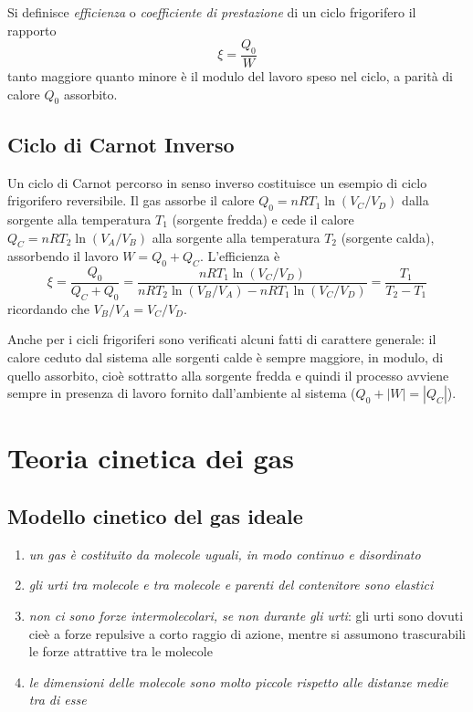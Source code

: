\documentclass[class=book, crop=false, oneside, 12pt]{standalone}
\begin{document}
Si definisce \emph{efficienza} o \emph{coefficiente di prestazione} di un ciclo frigorifero il rapporto
\begin{equation}
    \xi = \frac{Q_0}{W}
\end{equation}
tanto maggiore quanto minore è il modulo del lavoro speso nel ciclo, a parità di calore \(Q_0\) assorbito. 

\subsection{Ciclo di Carnot Inverso}

Un ciclo di Carnot percorso in senso inverso costituisce un esempio di ciclo frigorifero reversibile.
Il gas assorbe il calore $Q_0 = n R T_1 \ln (V_C / V_D )$ dalla sorgente alla temperatura $T_1$ (sorgente fredda) e cede il calore $Q_C = n R T_2 \ln (V_A / V_B )$ alla sorgente alla temperatura $T_2$ (sorgente calda), assorbendo il lavoro $W = Q_0 + Q_C$. 
L'efficienza è 
\begin{equation*}
    \xi = \frac{Q_0}{Q_C + Q_0} = \frac{n R T_1 \ln (V_C / V_D )}{n R T_2 \ln (V_B / V_A ) - n R T_1 \ln (V_C / V_D )} = \frac{T_1}{T_2 - T_1}
\end{equation*}
ricordando che \(V_B / V_A = V_C / V_D\).

Anche per i cicli frigoriferi sono verificati alcuni fatti di carattere generale: 
il calore ceduto dal sistema alle sorgenti calde è sempre maggiore, in modulo, di quello assorbito, cioè sottratto alla sorgente fredda e quindi il processo avviene sempre in presenza di lavoro fornito dall'ambiente al sistema ($Q_0 + |W| = | Q_C |$).

\section{Teoria cinetica dei gas}

\subsection{Modello cinetico del gas ideale}

\begin{enumerate}
    \item \emph{un gas è costituito da molecole uguali, in modo continuo e disordinato}
    \item \emph{gli urti tra molecole e tra molecole e parenti del contenitore sono elastici}
    \item \emph{non ci sono forze intermolecolari, se non durante gli urti}: gli urti sono dovuti cieè a forze repulsive a corto raggio di azione, mentre si assumono trascurabili le forze attrattive tra le molecole
    \item \emph{le dimensioni delle molecole sono molto piccole rispetto alle distanze medie tra di esse}
\end{enumerate}
\end{document}
